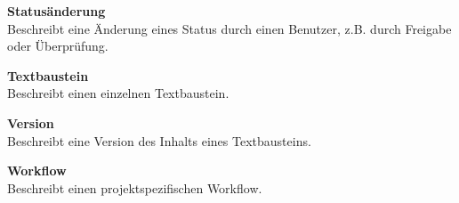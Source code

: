 \textsf{\textbf{Statusänderung}}\\Beschreibt eine Änderung eines Status durch einen Benutzer, z.B. durch Freigabe oder Überprüfung.

\textsf{\textbf{Textbaustein}}\\Beschreibt einen einzelnen Textbaustein.

\textsf{\textbf{Version}}\\Beschreibt eine Version des Inhalts eines Textbausteins.

\textsf{\textbf{Workflow}}\\Beschreibt einen projektspezifischen Workflow.
